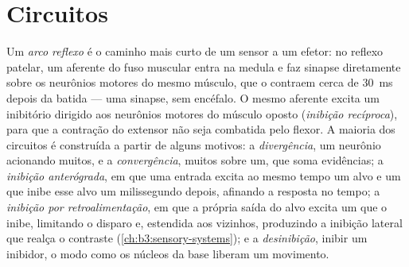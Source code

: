 \section{Circuitos}

\begin{definition}\label{def:b3:nervous-systems:circuits}
Um \emph{arco reflexo} é o caminho mais curto de um sensor a um efetor:
no reflexo patelar, um aferente do fuso muscular entra na medula e faz
sinapse diretamente sobre os neurônios motores do mesmo músculo, que o
contraem cerca de \qty{30}{ms} depois da batida --- uma sinapse, sem
encéfalo. O mesmo aferente excita um  inibitório dirigido
aos neurônios motores do músculo oposto (\emph{inibição recíproca}),
para que a contração do extensor não seja combatida pelo flexor. A
maioria dos circuitos é construída a partir de alguns motivos: a
\emph{divergência}, um neurônio acionando muitos, e a
\emph{convergência}, muitos sobre um, que soma evidências; a
\emph{inibição anterógrada}, em que uma entrada excita ao mesmo tempo um
alvo e um  que inibe esse alvo um milissegundo depois,
afinando a resposta no tempo; a \emph{inibição por retroalimentação}, em
que a própria saída do alvo excita um  que o inibe,
limitando o disparo e, estendida aos vizinhos, produzindo a inibição
lateral que realça o contraste (\cref{ch:b3:sensory-systems}); e a
\emph{desinibição}, inibir um inibidor, o modo como os núcleos da base
liberam um movimento.
\end{definition}

